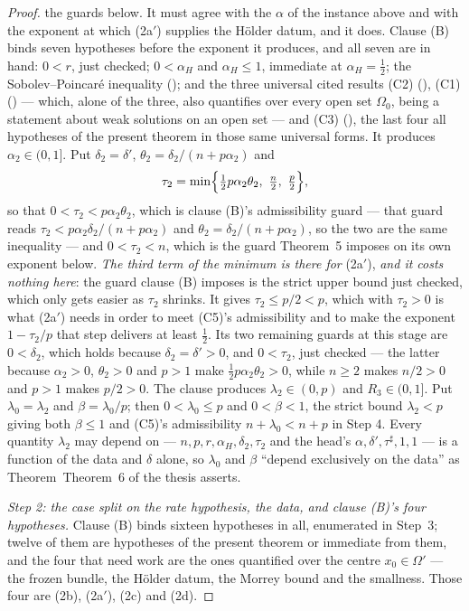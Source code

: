 \begin{proof}
the guards below.  It must agree with the $\alpha$ of the
 instance above and with the exponent
at which (2a$'$) supplies the H\"older datum, and it does.  Clause (B) binds
seven hypotheses before the
exponent it produces, and all seven are in hand: $0<r$, just checked;
$0<\alpha_H$ and $\alpha_H\le1$, immediate at $\alpha_H=\tfrac12$; the
Sobolev--Poincar\'e inequality (); and the
three universal cited results (C2) (), (C1)
() --- which, alone of the three, also quantifies
over every open set $\Omega_0$, being a statement about weak solutions on an open
set --- and (C3) (), the last four all hypotheses
of the present theorem in those same universal forms.  It
produces $\alpha_2\in(0,1]$.  Put $\delta_2=\delta'$,
$\theta_2=\delta_2/(n+p\alpha_2)$ and
\[
\tau_2=\min\Bigl\{\tfrac12p\alpha_2\theta_2,\ \tfrac n2,\ \tfrac p2\Bigr\},
\]
so that $0<\tau_2<p\alpha_2\theta_2$, which is clause (B)'s admissibility guard
--- that guard reads $\tau_2<p\alpha_2\delta_2/(n+p\alpha_2)$ and
$\theta_2=\delta_2/(n+p\alpha_2)$, so the two are the same inequality --- and
$0<\tau_2<n$, which is the guard Theorem~5 imposes on its own exponent below.
\emph{The third term of the minimum is there for} (2a$'$), \emph{and it costs
nothing here}: the guard clause (B) imposes is the strict upper bound just
checked, which only gets easier as $\tau_2$ shrinks.  It gives $\tau_2\le p/2<p$,
which with $\tau_2>0$ is what (2a$'$) needs in order to meet (C5)'s
admissibility and to make the exponent $1-\tau_2/p$ that step delivers at least
$\tfrac12$.
Its two remaining guards at this stage are $0<\delta_2$, which holds because
$\delta_2=\delta'>0$, and $0<\tau_2$, just checked --- the latter because
$\alpha_2>0$, $\theta_2>0$ and $p>1$ make $\tfrac12p\alpha_2\theta_2>0$, while
$n\ge2$ makes $n/2>0$ and $p>1$ makes $p/2>0$.  The clause produces
$\lambda_2\in(0,p)$ and $R_3\in(0,1]$.  Put
$\lambda_0=\lambda_2$ and $\beta=\lambda_0/p$; then $0<\lambda_0\le p$ and
$0<\beta<1$, the strict bound $\lambda_2<p$ giving both $\beta\le1$ and (C5)'s
admissibility $n+\lambda_0<n+p$ in Step 4.  Every quantity $\lambda_2$ may
depend on --- $n,p,r,\alpha_H,\delta_2,\tau_2$ and the head's
$\alpha,\delta',\tau^\sharp,1,1$ --- is a function of the data and $\delta$
alone, so $\lambda_0$ and $\beta$ ``depend exclusively on the data'' as
Theorem~Theorem~6 of the thesis asserts.

\emph{Step 2: the case split on the rate hypothesis, the data, and clause
\textup{(B)}'s four hypotheses.}  Clause (B) binds sixteen hypotheses in all,
enumerated in Step~3; twelve of them are hypotheses of the present theorem or
immediate from them, and the four that need work are the ones quantified over
the centre $x_0\in\Omega'$ --- the frozen bundle, the H\"older datum, the
Morrey bound and the smallness.  Those four are (2b), (2a$'$), (2c) and (2d).


\end{proof}
